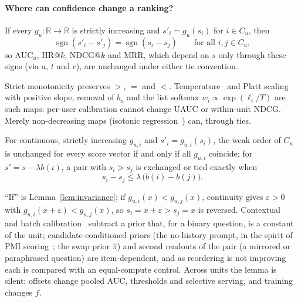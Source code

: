 \paragraph{Where can confidence change a ranking?}
\begin{lemma}[Invariance]\label{lem:invariance}\label{prop:monotone}
If every $g_u:\mathbb R\to\mathbb R$ is strictly increasing and $s'_i=g_u(s_i)$ for $i\in C_u$, then
\[
  \operatorname{sgn}(s'_i-s'_j)=\operatorname{sgn}(s_i-s_j)\qquad\text{for all } i,j\in C_u,
\]
so $\mathrm{AUC}_u$, HR@$k$, NDCG@$k$ and MRR, which depend on $s$ only through these signs (via $a$, $t$ and $c$), are
unchanged under either tie convention.
\end{lemma}
\noindent Strict monotonicity preserves $>$, $=$ and $<$. Temperature~\citep{guo2017calibration} and Platt
scaling~\citep{platt2000probabilities} with positive slope, removal of $b_u$ and the list softmax $w_i\propto\exp(\ell_i/T)$ are such
maps: per-user calibration cannot change UAUC or within-unit NDCG. Merely non-decreasing maps (isotonic
regression~\citep{zadrozny2002transforming}) can, through ties.
\begin{proposition}\label{prop:itemdep}
For continuous, strictly increasing $g_{u,i}$ and $s'_i=g_{u,i}(s_i)$, the weak order of $C_u$ is unchanged for every score
vector if and only if all $g_{u,i}$ coincide; for $s'=s-\lambda b(i)$, a pair with $s_i>s_j$ is exchanged or tied exactly when
\[
  s_i-s_j\le\lambda\,\bigl(b(i)-b(j)\bigr).
\]
\end{proposition}
\noindent ``If'' is Lemma~\ref{lem:invariance}; if $g_{u,i}(x)<g_{u,j}(x)$, continuity gives $\varepsilon>0$ with
$g_{u,i}(x{+}\varepsilon)<g_{u,j}(x)$, so $s_i=x{+}\varepsilon>s_j=x$ is reversed. Contextual~\citep{zhao2021calibrate} and batch
calibration~\citep{zhou2024batch} subtract a prior that, for a binary question, is a constant of the unit; candidate-conditioned priors
(the no-history prompt, in the spirit of PMI scoring~\citep{holtzman2021surface}; the swap prior $\hat\pi$) and second readouts of the
pair (a mirrored or paraphrased question) are item-dependent, and as reordering is not improving each is compared with an
equal-compute control. Across units the lemma is silent: offsets change pooled AUC, thresholds and selective serving, and training
changes $f$.
